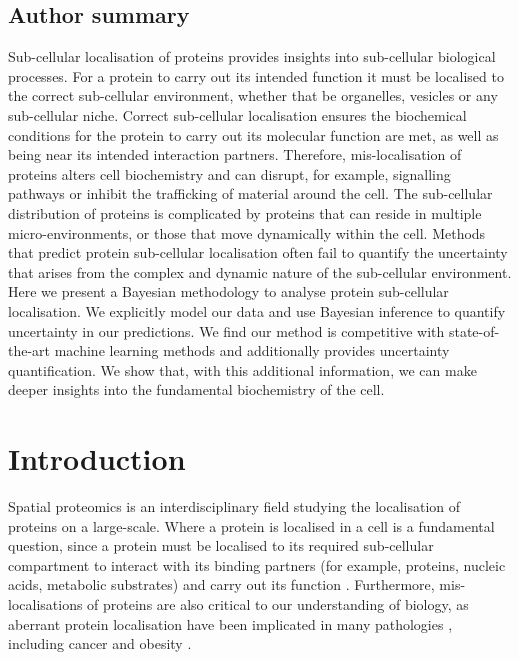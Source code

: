 \documentclass[12pt,english]{article}\usepackage[]{graphicx}\usepackage[]{color}
\begin{document}
\subsection*{Author summary}

Sub-cellular localisation of proteins provides insights into
sub-cellular biological processes. For a protein to carry out its
intended function it must be localised to the correct sub-cellular
environment, whether that be organelles, vesicles or any sub-cellular
niche. Correct sub-cellular localisation ensures the biochemical
conditions for the protein to carry out its molecular function are
met, as well as being near its intended interaction
partners. Therefore, mis-localisation of proteins alters cell
biochemistry and can disrupt, for example, signalling pathways or
inhibit the trafficking of material around the cell. The sub-cellular
distribution of proteins is complicated by proteins that can reside in
multiple micro-environments, or those that move dynamically within the
cell. Methods that predict protein sub-cellular localisation often
fail to quantify the uncertainty that arises from the complex and
dynamic nature of the sub-cellular environment. Here we present a
Bayesian methodology to analyse protein sub-cellular localisation. We
explicitly model our data and use Bayesian inference to quantify
uncertainty in our predictions. We find our
method is competitive with state-of-the-art machine learning methods
and additionally provides uncertainty quantification. We show that, with this
additional information, we can make deeper insights into the
fundamental biochemistry of the cell.



\section*{Introduction}\label{Intro}

Spatial proteomics is an interdisciplinary field studying the
localisation of proteins on a large-scale. Where a protein is
localised in a cell is a fundamental question, since a protein must be
localised to its required sub-cellular compartment to interact with
its binding partners (for example, proteins, nucleic acids, metabolic
substrates) and carry out its function
\citep{Gibson:2009}. Furthermore, mis-localisations of proteins are
also critical to our understanding of biology, as aberrant protein
localisation have been implicated in many pathologies
\citep{Olkkonen:2006, Luheshi:2008, Laurila:2009, De:2011, Cody:2013},
including cancer \citep{Kau:2004, Rodriguez:2004, Latorre:2005,
  Shin:2013} and obesity \citep{Siljee:2018}.
\end{document}
